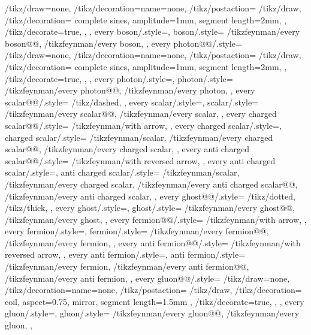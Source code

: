 {{    /tikz/draw=none,
    /tikz/decoration={name=none},
    /tikz/postaction={
      /tikz/draw,
      /tikz/decoration={
        complete sines,
        amplitude=1mm,
        segment length=2mm,
      },
      /tikz/decorate=true,
    },
  },
  every boson/.style={},
  boson/.style={
    /tikzfeynman/every boson@@,
    /tikzfeynman/every boson,
  },
  every photon@@/.style={
    /tikz/draw=none,
    /tikz/decoration={name=none},
    /tikz/postaction={
      /tikz/draw,
      /tikz/decoration={
        complete sines,
        amplitude=1mm,
        segment length=2mm,
      },
      /tikz/decorate=true,
    },
  },
  every photon/.style={},
  photon/.style={
    /tikzfeynman/every photon@@,
    /tikzfeynman/every photon,
  },
  every scalar@@/.style={
    /tikz/dashed,
  },
  every scalar/.style={},
  scalar/.style={
    /tikzfeynman/every scalar@@,
    /tikzfeynman/every scalar,
  },
  every charged scalar@@/.style={
    /tikzfeynman/with arrow,
  },
  every charged scalar/.style={},
  charged scalar/.style={
    /tikzfeynman/scalar,
    /tikzfeynman/every charged scalar@@,
    /tikzfeynman/every charged scalar,
  },
  every anti charged scalar@@/.style={
    /tikzfeynman/with reversed arrow,
  },
  every anti charged scalar/.style={},
  anti charged scalar/.style={
    /tikzfeynman/scalar,
    /tikzfeynman/every charged scalar,
    /tikzfeynman/every anti charged scalar@@,
    /tikzfeynman/every anti charged scalar,
  },
  every ghost@@/.style={
    /tikz/dotted,
    /tikz/thick,
  },
  every ghost/.style={},
  ghost/.style={
    /tikzfeynman/every ghost@@,
    /tikzfeynman/every ghost,
  },
  every fermion@@/.style={
    /tikzfeynman/with arrow,
  },
  every fermion/.style={},
  fermion/.style={
    /tikzfeynman/every fermion@@,
    /tikzfeynman/every fermion,
  },
  every anti fermion@@/.style={
    /tikzfeynman/with reversed arrow,
  },
  every anti fermion/.style={},
  anti fermion/.style={
    /tikzfeynman/every fermion,
    /tikzfeynman/every anti fermion@@,
    /tikzfeynman/every anti fermion,
  },
  every gluon@@/.style={
    /tikz/draw=none,
    /tikz/decoration={name=none},
    /tikz/postaction={
      /tikz/draw,
      /tikz/decoration={
        coil,
        aspect=0.75,
        mirror,
        segment length=1.5mm
      },
      /tikz/decorate=true,
    },
  },
  every gluon/.style={},
  gluon/.style={
    /tikzfeynman/every gluon@@,
    /tikzfeynman/every gluon,
  },
}
